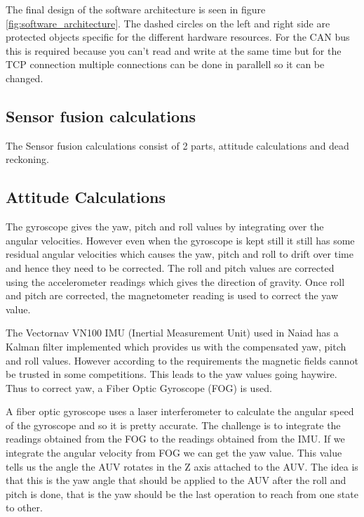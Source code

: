 The final design of the software architecture is seen in figure \ref{fig:software_architecture}.
The dashed circles on the left and right side are protected objects specific for
the different hardware resources. For the CAN bus this is required because you
can't read and write at the same time but for the TCP connection multiple connections
can be done in parallell so it can be changed.


\subsection{Sensor fusion calculations}
The Sensor fusion calculations consist of 2 parts, attitude calculations and
dead reckoning.

\subsection{Attitude Calculations}
The gyroscope gives the yaw, pitch and roll values by integrating over the
angular velocities. However even when the gyroscope is kept still it still has
some residual angular velocities which causes the yaw, pitch and roll to drift
over time and hence they need to be corrected. The roll and pitch values are
corrected using the accelerometer readings which gives the direction of gravity.
Once roll and pitch are corrected, the magnetometer reading is used to correct
the yaw value.

The Vectornav VN100 IMU (Inertial Measurement Unit) used in Naiad has a Kalman
filter implemented which provides us with the compensated yaw, pitch and roll
values. However according to the requirements the magnetic fields cannot be
trusted in some competitions. This leads to the yaw values going haywire.
Thus to correct yaw, a Fiber Optic Gyroscope (FOG) is used.

A fiber optic gyroscope uses a laser interferometer to calculate the angular
speed of the gyroscope and so it is pretty accurate. The challenge is to
integrate the readings obtained from the FOG to the readings obtained from
the IMU. If we integrate the angular velocity from FOG we can get the yaw value.
This value tells us the angle the AUV rotates in the Z axis attached to the AUV.
The idea is that this is the yaw angle that should be applied to the AUV after
the roll and pitch is done, that is the yaw should be the last operation to
reach from one state to other.

